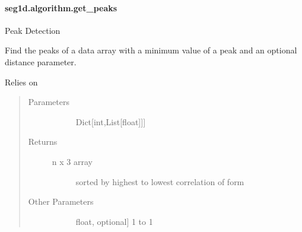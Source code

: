 \documentclass[letterpaper,10pt,english]{sphinxmanual}
\begin{document}
\paragraph{seg1d.algorithm.get\_peaks}
\label{\detokenize{generated/seg1d.algorithm.get_peaks:seg1d-algorithm-get-peaks}}\label{\detokenize{generated/seg1d.algorithm.get_peaks::doc}}

\begin{fulllineitems}
\label{\detokenize{generated/seg1d.algorithm.get_peaks:seg1d.algorithm.get_peaks}}
\sphinxAtStartPar
Peak Detection

\sphinxAtStartPar
Find the peaks of a data array with a minimum value of a peak
and an optional distance parameter.

\sphinxAtStartPar
Relies on 
\begin{quote}\begin{description}
\item[{Parameters}] \leavevmode\begin{description}
\item[{}] \leavevmode{[}Dict{[}int,List{[}float{]}{]}{]}
\sphinxAtStartPar
{}

\end{description}

\item[{Returns}] \leavevmode\begin{description}
\item[{n x 3 array}] \leavevmode
\sphinxAtStartPar
sorted by highest to lowest correlation of form

\end{description}

\item[{Other Parameters}] \leavevmode\begin{description}
\item[{}] \leavevmode{[}float, optional{]}
\sphinxAtStartPar
\sphinxhyphen{}1 to 1


\end{description}
\end{description}
\end{quote}
\end{fulllineitems}
\end{document}
